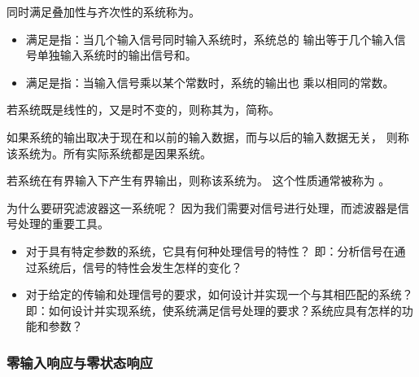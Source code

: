 \begin{definition}[线性系统]
    同时满足叠加性与齐次性的系统称为。
    \begin{itemize}
        \item 满足是指：当几个输入信号同时输入系统时，系统总的
            输出等于几个输入信号单独输入系统时的输出信号和。
        \item 满足是指：当输入信号乘以某个常数时，系统的输出也
            乘以相同的常数。
    \end{itemize}
\end{definition}

\begin{definition}[时不变系统]
    若系统既是线性的，又是时不变的，则称其为，简称。
\end{definition}

\begin{definition}[因果系统]
    如果系统的输出取决于现在和以前的输入数据，而与以后的输入数据无关，
    则称该系统为。所有实际系统都是因果系统。
\end{definition}

\begin{definition}[稳定系统]
    若系统在有界输入下产生有界输出，则称该系统为。
    这个性质通常被称为 。
\end{definition}

\begin{remark}
    为什么要研究滤波器这一系统呢？
    因为我们需要对信号进行处理，而滤波器是信号处理的重要工具。
    \begin{itemize}
        \item 对于具有特定参数的系统，它具有何种处理信号的特性？
            \subitem 即：分析信号在通过系统后，信号的特性会发生怎样的变化？
        \item 对于给定的传输和处理信号的要求，如何设计并实现一个与其相匹配的系统？
            \subitem 即：如何设计并实现系统，使系统满足信号处理的要求？系统应具有怎样的功能和参数？
    \end{itemize}
\end{remark}

\begin{example}[系统的描述方法]    
\end{example}

\subsubsection{零输入响应与零状态响应}

